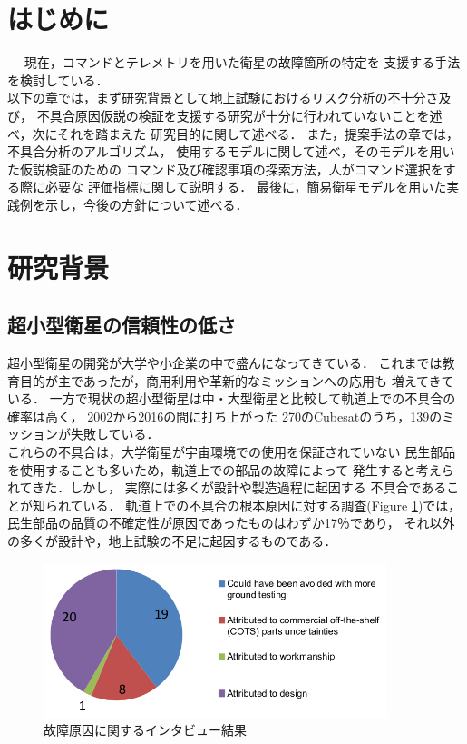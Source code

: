\documentclass[11pt]{article}
\begin{document}
\fi

\section{はじめに}  
現在，コマンドとテレメトリを用いた衛星の故障箇所の特定を
支援する手法を検討している．\\
以下の章では，まず研究背景として地上試験におけるリスク分析の不十分さ及び，
不具合原因仮説の検証を支援する研究が十分に行われていないことを述べ，次にそれを踏まえた
研究目的に関して述べる．
また，提案手法の章では，不具合分析のアルゴリズム，
使用するモデルに関して述べ，そのモデルを用いた仮説検証のための
コマンド及び確認事項の探索方法，人がコマンド選択をする際に必要な
評価指標に関して説明する．
最後に，簡易衛星モデルを用いた実践例を示し，今後の方針について述べる．

\section{研究背景} 
\subsection{超小型衛星の信頼性の低さ}

超小型衛星の開発が大学や小企業の中で盛んになってきている．
これまでは教育目的が主であったが，商用利用や革新的なミッションへの応用も
増えてきている\cite{Langer2016}．
一方で現状の超小型衛星は中・大型衛星と比較して軌道上での不具合の確率は高く，
2002から2016の間に打ち上がった
270のCubesatのうち，139のミッションが失敗している\cite{Langer2016}．\\
これらの不具合は，大学衛星が宇宙環境での使用を保証されていない
民生部品を使用することも多いため，軌道上での部品の故障によって
発生すると考えられてきた．しかし，
実際には多くが設計や製造過程に起因する
不具合であることが知られている\cite{Venturini2017}．
軌道上での不具合の根本原因に対する調査(Figure \ref{fig:cause of failure})では，
民生部品の品質の不確定性が原因であったものはわずか17％であり，
それ以外の多くが設計や，地上試験の不足に起因するものである\cite{Venturini2017}．

\begin{figure}[H]
   \centering
      \includegraphics[height=4.5cm]{figure/cause_of_failure.png}
      \caption{故障原因に関するインタビュー結果\cite{Venturini2017}}
      \label{fig:cause of failure}
\end{figure}
\end{document}
